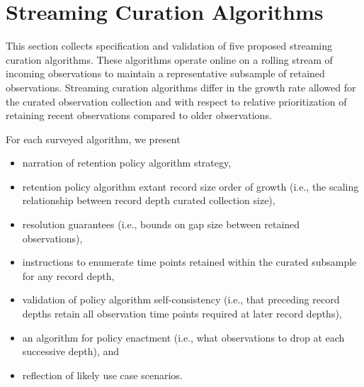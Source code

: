 \section{Streaming Curation Algorithms} \label{sec:annotation-algorithms}



This section collects specification and validation of five proposed streaming curation algorithms.
These algorithms operate online on a rolling stream of incoming observations to maintain a representative subsample of retained observations.
Streaming curation algorithms differ in the growth rate allowed for the curated observation collection and with respect to relative prioritization of retaining recent observations compared to older observations.

For each surveyed algorithm, we present
\begin{itemize}
\item narration of retention policy algorithm strategy,
\item retention policy algorithm extant record size order of growth (i.e., the scaling relationship between record depth curated collection size),
\item resolution guarantees (i.e., bounds on gap size between retained observations),
\item instructions to enumerate time points retained within the curated subsample for any record depth,
\item validation of policy algorithm self-consistency (i.e., that preceding record depths retain all observation time points required at later record depths),
\item an algorithm for policy enactment (i.e., what observations to drop at each successive depth), and
\item reflection of likely use case scenarios.
\end{itemize}

